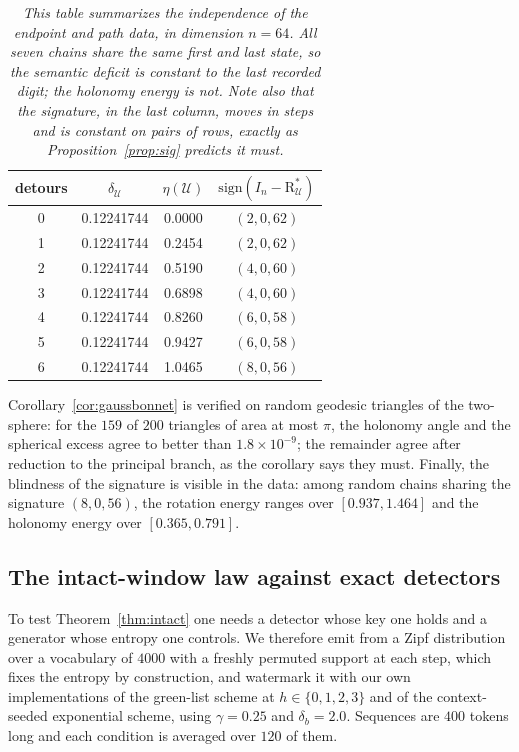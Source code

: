 \documentclass[11pt,a4paper]{article}
\theoremstyle{plain}
\theoremstyle{definition}
\numberwithin{equation}{section}
\newcommand{\sgn}{\mathrm{sign}}
\newcommand{\Uc}{\mathcal{U}}
\begin{document}
\begin{table}[t]
\centering
\small
\begin{tabular}{cccc}
\toprule
detours & $\delta_\Uc$ & $\eta(\Uc)$ & $\sgn(I_n-\mathrm{R}^{*}_\Uc)$\\
\midrule
0 & 0.12241744 & 0.0000 & $(2,0,62)$\\
1 & 0.12241744 & 0.2454 & $(2,0,62)$\\
2 & 0.12241744 & 0.5190 & $(4,0,60)$\\
3 & 0.12241744 & 0.6898 & $(4,0,60)$\\
4 & 0.12241744 & 0.8260 & $(6,0,58)$\\
5 & 0.12241744 & 0.9427 & $(6,0,58)$\\
6 & 0.12241744 & 1.0465 & $(8,0,56)$\\
\bottomrule
\end{tabular}
\caption{\emph{This table summarizes the independence of the endpoint
and path data, in dimension $n=64$. All seven chains share the same
first and last state, so the semantic deficit is constant to the last
recorded digit; the holonomy energy is not. Note also that the
signature, in the last column, moves in steps and is constant on pairs
of rows, exactly as Proposition~\ref{prop:sig} predicts it must.}}
\label{tab:realisability}
\end{table}

Corollary~\ref{cor:gaussbonnet} is verified on random geodesic triangles
of the two-sphere: for the $159$ of $200$ triangles of area at most
$\pi$, the holonomy angle and the spherical excess agree to better than
$1.8\times 10^{-9}$; the remainder agree after reduction to the
principal branch, as the corollary says they must. Finally, the
blindness of the signature is visible in the data: among random chains
sharing the signature $(8,0,56)$, the rotation energy ranges over
$[0.937,1.464]$ and the holonomy energy over $[0.365,0.791]$.

\subsection{The intact-window law against exact detectors}

To test Theorem~\ref{thm:intact} one needs a detector whose key one
holds and a generator whose entropy one controls. We therefore emit
from a Zipf distribution over a vocabulary of $4000$ with a freshly
permuted support at each step, which fixes the entropy by construction,
and watermark it with our own implementations of the green-list scheme
at $h \in \{0,1,2,3\}$ and of the context-seeded exponential scheme,
using $\gamma = 0.25$ and $\delta_b = 2.0$. Sequences are $400$ tokens
long and each condition is averaged over $120$ of them.
\end{document}
